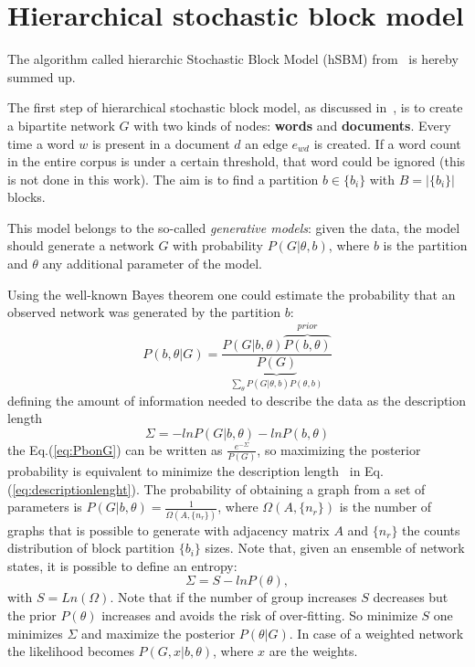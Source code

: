 \appendix
\chapter{Hierarchical stochastic block model}\label{app:hsbm}
The algorithm called hierarchic Stochastic Block Model (hSBM) from~\cite{gerlach2018network} is hereby summed up.

The first step of hierarchical stochastic block model, as discussed in~\cite{peixoto2014efficient}, is to create a bipartite network $G$ with two kinds of nodes: \textbf{words} and \textbf{documents}. Every time a word $w$ is present in a document $d$ an edge $e_{wd}$ is created. If a word count in the entire corpus is under a certain threshold, that word could be ignored (this is not done in this work). The aim is to find a partition $b\in\{b_i\}$ with $B=\left|\{b_i\}\right|$ blocks.

This model belongs to the so-called \textit{generative models}: given the data, the model should generate a network $G$ with probability $P(G|\theta, b)$, where $b$ is the partition and $\theta$ any additional parameter of the model.

Using the well-known Bayes theorem one could estimate the probability that an observed network was generated by the partition $b$:
\begin{equation}\label{eq:PbonG}
  P(b,\theta|G)=\frac{P(G|b,\theta)\overbrace{P(b,\theta)}^{prior}}{\underbrace{P(G)}_{\sum_{\theta}P(G|\theta, b)P(\theta, b)}}
\end{equation}
defining the amount of information needed to describe the data as the description length
\begin{equation}\label{eq:descriptionlenght}
  \Sigma=-lnP(G|b,\theta)-lnP(b, \theta)
\end{equation}
the Eq.(\ref{eq:PbonG}) can be written as $\frac{e^{-\Sigma}}{P(G)}$, so maximizing the posterior probability is equivalent to minimize the description length~ in Eq.(\ref{eq:descriptionlenght}). The probability of obtaining a graph from a set of parameters is $P(G|b,\theta)=\frac{1}{\Omega(A,\{n_r\})}$, where $\Omega(A,\{n_r\})$ is the number of graphs that is possible to generate with adjacency matrix $A$ and $\{n_r\}$ the counts distribution of block partition $\{b_i\}$ sizes.
Note that, given an ensemble of network states, it is possible to define an entropy:
\[
\Sigma=S-lnP(\theta),
\]
with $S=Ln\left(\Omega\right)$. Note that if the number of group increases $S$ decreases but the prior $P(\theta)$ increases and avoids the risk of over-fitting.
So minimize $S$ one minimizes $\Sigma$ and maximize the posterior $P(\theta|G)$.
In case of a weighted network the likelihood becomes $P(G,x|b,\theta)$, where $x$ are the weights.

